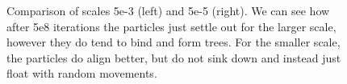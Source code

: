 \begin{figure}[h]
  \begin{minipage}[t]{0.45\textwidth}
  \end{minipage}
  \hfill
  \begin{minipage}[t]{0.45\textwidth}
  \end{minipage}
  \caption{Comparison of scales 5e-3 (left) and 5e-5 (right). We can see how after 5e8 iterations the particles just settle out for the larger scale, however they do tend to bind and form trees. For the smaller scale, the particles do align better, but do not sink down and instead just float with random movements.}
  \label{fig:sca_comp1}
\end{figure}
